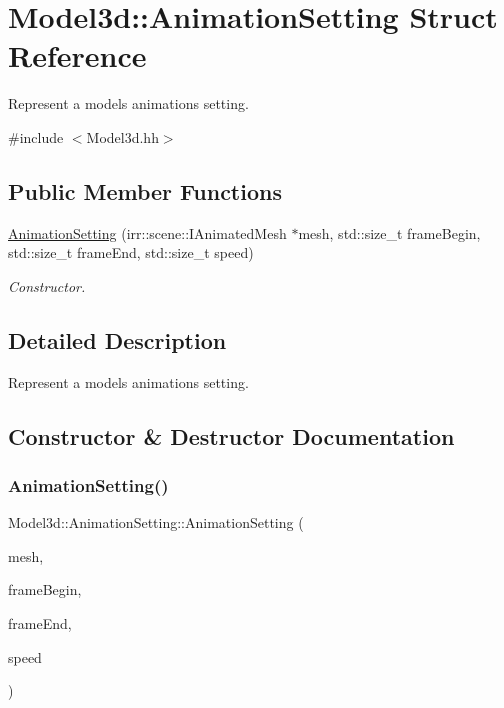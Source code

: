 \hypertarget{structModel3d_1_1AnimationSetting}{}\section{Model3d\+:\+:Animation\+Setting Struct Reference}
\label{structModel3d_1_1AnimationSetting}


Represent a model\textquotesingle{}s animation\textquotesingle{}s setting.  




{\ttfamily \#include $<$Model3d.\+hh$>$}

\subsection*{Public Member Functions}
\begin{DoxyCompactItemize}
\item 
\hyperlink{structModel3d_1_1AnimationSetting_acd9f22875f006130f81d50939a4348d6}{Animation\+Setting} (irr\+::scene\+::\+I\+Animated\+Mesh $\ast$mesh, std\+::size\+\_\+t frame\+Begin, std\+::size\+\_\+t frame\+End, std\+::size\+\_\+t speed)
\begin{DoxyCompactList}\small\item\em Constructor. \end{DoxyCompactList}\end{DoxyCompactItemize}


\subsection{Detailed Description}
Represent a model\textquotesingle{}s animation\textquotesingle{}s setting. 

\subsection{Constructor \& Destructor Documentation}
\mbox{\label{structModel3d_1_1AnimationSetting_acd9f22875f006130f81d50939a4348d6}} 
\subsubsection{\texorpdfstring{Animation\+Setting()}{AnimationSetting()}}
{\footnotesize\ttfamily Model3d\+::\+Animation\+Setting\+::\+Animation\+Setting (\begin{DoxyParamCaption}\item[{irr\+::scene\+::\+I\+Animated\+Mesh $\ast$}]{mesh,  }\item[{std\+::size\+\_\+t}]{frame\+Begin,  }\item[{std\+::size\+\_\+t}]{frame\+End,  }\item[{std\+::size\+\_\+t}]{speed }\end{DoxyParamCaption})}



